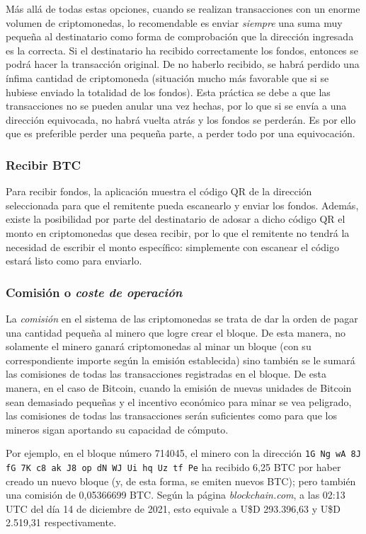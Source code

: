 \documentclass[12pt,a4paper,twoside]{book}
\begin{document}
Más allá de todas estas opciones, cuando se realizan transacciones con un enorme volumen de criptomonedas, lo recomendable es enviar \textit{siempre} una suma muy pequeña al destinatario como forma de comprobación que la dirección ingresada es la correcta. Si el destinatario ha recibido correctamente los fondos, entonces se podrá hacer la transacción original. De no haberlo recibido, se habrá perdido una ínfima cantidad de criptomoneda (situación mucho más favorable que si se hubiese enviado la totalidad de los fondos). Esta práctica se debe a que las transacciones no se pueden anular una vez hechas, por lo que si se envía a una dirección equivocada, no habrá vuelta atrás y los fondos se perderán. Es por ello que es preferible perder una pequeña parte, a perder todo por una equivocación.

\subsubsection{Recibir BTC}
Para recibir fondos, la aplicación muestra el código QR de la dirección seleccionada para que el remitente pueda escanearlo y enviar los fondos. Además, existe la posibilidad por parte del destinatario de adosar a dicho código QR el monto en criptomonedas que desea recibir, por lo que el remitente no tendrá la necesidad de escribir el monto específico: simplemente con escanear el código estará listo como para enviarlo.

\subsubsection{Comisión o \textit{coste de operación}}
La \textit{comisión} en el sistema de las criptomonedas se trata de dar la orden de pagar una cantidad pequeña al minero que logre crear el bloque. De esta manera, no solamente el minero ganará criptomonedas al minar un bloque (con su correspondiente importe según la emisión establecida) sino también se le sumará las comisiones de todas las transacciones registradas en el bloque. De esta manera, en el caso de Bitcoin, cuando la emisión de nuevas unidades de Bitcoin sean demasiado pequeñas y el incentivo económico para minar se vea peligrado, las comisiones de todas las transacciones serán suficientes como para que los mineros sigan aportando su capacidad de cómputo.

Por ejemplo, en el bloque número 714045, el minero con la dirección \texttt{1G Ng wA 8J fG 7K c8 ak J8 op dN WJ Ui hq Uz tf Pe} ha recibido 6,25 BTC por haber creado un nuevo bloque (y, de esta forma, se emiten nuevos BTC); pero también una comisión de 0,05366699 BTC. Según la página \textit{blockchain.com}, a las 02:13 UTC del día 14 de diciembre de 2021, esto equivale a U\$D 293.396,63 y U\$D 2.519,31 respectivamente.
\end{document}
